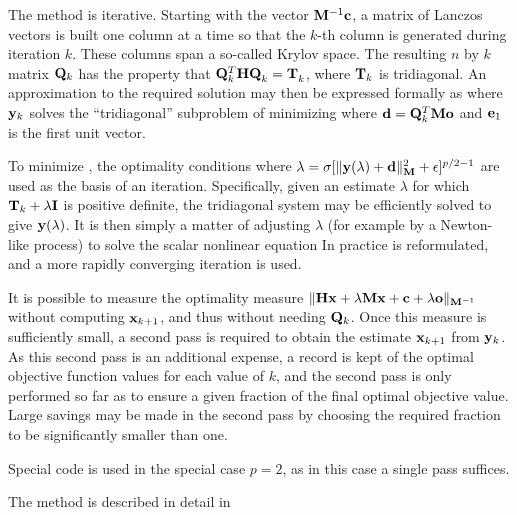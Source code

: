 \documentclass{galahad}
\begin{document}
\noindent
The method is iterative. Starting  with the vector ${\mathbf{M}}^{-1} {\mathbf{c}}$,
a matrix of Lanczos vectors is built one column at a time
so that the $k$-th column is generated during
iteration $k$. These columns span a so-called Krylov space.
The resulting $n$ by $k$ matrix ${\mathbf{Q}}_k $ has the
property that ${\mathbf{Q}}_{k}^T {\mathbf{H}} {\mathbf{Q}}_k^{}  =  {\mathbf{T}}_{k}^{}$,
where ${\mathbf{T}}_k$ is tridiagonal. An approximation to the
required solution may then be expressed formally as
where ${\mathbf{y}}_k $ solves the ``tridiagonal'' subproblem of minimizing
where ${\mathbf{d}} = {\mathbf{Q}}_k^T {\mathbf{M}} {\mathbf{o}}$ and ${\mathbf{e}}_1$ is the first unit vector.

To minimize , the optimality conditions
where $\lambda = \sigma [ \|{\mathbf{y}}(\lambda)+{\mathbf{d}}\|_{{\mathbf{M}}}^2 + \epsilon]^{p/2-1}$
are used as the basis of an iteration. Specifically, given an estimate
$\lambda$ for which $ {\mathbf{T}}_k + \lambda {\mathbf{I}}$ is positive definite,
the tridiagonal system  may be efficiently solved to give
${\mathbf{y}}(\lambda)$. It is then simply a matter of adjusting $\lambda$
(for example by a Newton-like process) to solve the scalar nonlinear equation
In practice  is reformulated, and a more rapidly converging iteration is
used.

It is possible to measure the optimality measure
$\|{\mathbf{H}} {\mathbf{x}}  +  \lambda {\mathbf{M}} {\mathbf{x}}  +  {\mathbf{c}} + \lambda {\mathbf{o}}\|_{{\mathbf{M}}^{-1}}$
without computing ${\mathbf{x}}_{k+1}$, and thus without
needing ${\mathbf{Q}}_k $. Once this measure is sufficiently small, a second pass
is required to obtain the estimate ${\mathbf{x}}_{k+1} $ from ${\mathbf{y}}_k $.
As this second pass is an additional expense, a record is kept of the
optimal objective function values for each value of $k$, and the second
pass is only performed so far as to ensure a given fraction of the
final optimal objective value. Large savings may be made in the second
pass by choosing the required fraction to be significantly smaller than one.

Special code is used in the special case $p=2$, as in this case a single
pass suffices.

\galreference
The method is described in detail in
\vspace*{1mm}
\end{document}
